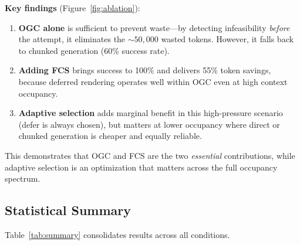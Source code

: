 \documentclass[11pt,twocolumn]{article}
\begin{document}
\textbf{Key findings} (Figure~\ref{fig:ablation}):

\begin{enumerate}[leftmargin=*,itemsep=1pt]
  \item \textbf{OGC alone} is sufficient to prevent waste---by
    detecting infeasibility \emph{before} the attempt, it eliminates
    the ${\sim}50{,}000$ wasted tokens.  However, it falls back to
    chunked generation (60\% success rate).
  \item \textbf{Adding FCS} brings success to 100\% and delivers
    55\% token savings, because deferred rendering operates well
    within OGC even at high context occupancy.
  \item \textbf{Adaptive selection} adds marginal benefit in this
    high-pressure scenario (defer is always chosen), but matters at
    lower occupancy where direct or chunked generation is cheaper
    and equally reliable.
\end{enumerate}

This demonstrates that OGC and FCS are the two \emph{essential}
contributions, while adaptive selection is an optimization that
matters across the full occupancy spectrum.


\subsection{Statistical Summary}

Table~\ref{tab:summary} consolidates results across all conditions.
\end{document}

